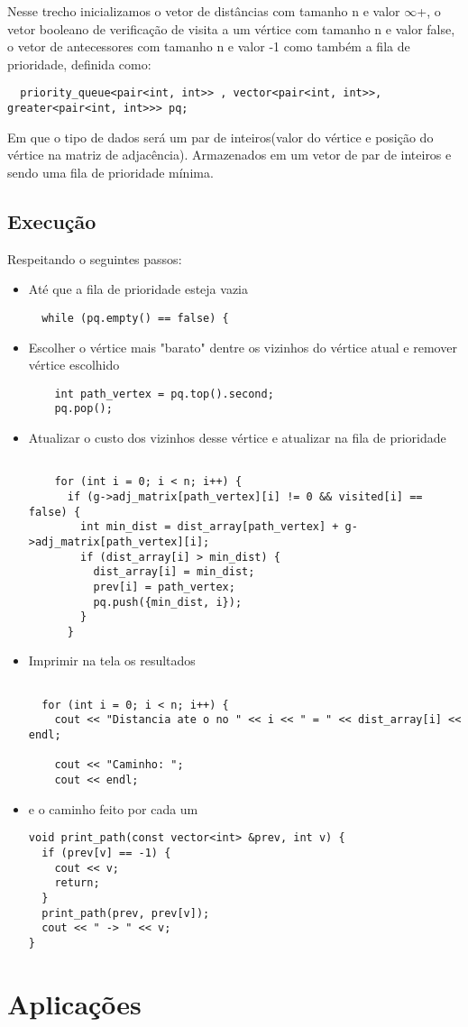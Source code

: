 \documentclass{article}
\begin{document}
 Nesse trecho inicializamos o vetor de distâncias com tamanho n e valor $\infty$+, o vetor booleano de verificação de visita a um vértice com tamanho n e valor false, o vetor de antecessores com tamanho n e valor -1 como também a fila de prioridade, definida como:  
\begin{lstlisting}
  priority_queue<pair<int, int>> , vector<pair<int, int>>, greater<pair<int, int>>> pq;
\end{lstlisting}
Em que o tipo de dados será um par de inteiros(valor do vértice e posição do vértice na matriz de adjacência). Armazenados em um vetor de par de inteiros e sendo uma fila de prioridade mínima.

\subsection{Execução}
Respeitando o seguintes passos: 
\begin{itemize}
  \item Até que a fila de prioridade esteja vazia
  \begin{lstlisting}
  while (pq.empty() == false) {
  \end{lstlisting}
  \item Escolher o vértice mais "barato" dentre os vizinhos do vértice atual e remover vértice escolhido

  \begin{lstlisting}
    int path_vertex = pq.top().second;
    pq.pop();
  \end{lstlisting}
	\item Atualizar o custo dos vizinhos desse vértice e atualizar na fila de prioridade
  \begin{lstlisting}

    for (int i = 0; i < n; i++) {
      if (g->adj_matrix[path_vertex][i] != 0 && visited[i] == false) {
        int min_dist = dist_array[path_vertex] + g->adj_matrix[path_vertex][i];
        if (dist_array[i] > min_dist) {
          dist_array[i] = min_dist;
          prev[i] = path_vertex;
          pq.push({min_dist, i});
        }
      }
  \end{lstlisting}
  \pagebreak
\item Imprimir na tela os resultados
  \begin{lstlisting}

  for (int i = 0; i < n; i++) {
    cout << "Distancia ate o no " << i << " = " << dist_array[i] << endl;

    cout << "Caminho: ";
    cout << endl;
  \end{lstlisting}
\item e o caminho feito por cada um 
  \begin{lstlisting}
void print_path(const vector<int> &prev, int v) {
  if (prev[v] == -1) {
    cout << v; 
    return;
  }
  print_path(prev, prev[v]); 
  cout << " -> " << v;       
}
  \end{lstlisting}

\end{itemize}

\pagebreak
\section{Aplicações}
\end{document}
